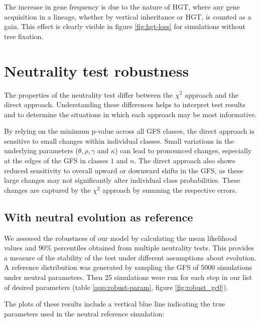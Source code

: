 The increase in gene frequency is due to the nature of \ac{HGT}, where any gene acquisition in a lineage, whether by vertical inheritance or \ac{HGT}, is counted as a gain.
This effect is clearly visible in figure \ref{fig:hgt-loss} for simulations without tree fixation.

\section{Neutrality test robustness}
The properties of the neutrality test differ between the $\chi^2$ approach and the direct approach.
Understanding these differences helps to interpret test results and to determine the situations in which each approach may be most informative.

By relying on the minimum p-value across all \ac{GFS} classes, the direct approach is sensitive to small changes within individual classes.
Small variations in the underlying parameters ($\theta, \rho, \gamma$ and $\kappa$) can lead to pronounced changes, especially at the edges of the \ac{GFS} in classes $1$ and $n$.
The direct approach also shows reduced sensitivity to overall upward or downward shifts in the GFS, as these large changes may not significantly alter individual class probabilities.
These changes are captured by the $\chi^2$ approach by summing the respective errors.

\subsection{With neutral evolution as reference}
We assessed the robustness of our model by calculating the mean likelihood values and 90\% percentiles obtained from multiple neutrality tests.
This provides a measure of the stability of the test under different assumptions about evolution.
A reference distribution was generated by sampling the \ac{GFS} of 5000 simulations under neutral parameters.
Then 25 simulations were run for each step in our list of desired parameters (table \ref{app:robust-param}, figure \ref{fig:robust_gc0}).

The plots of these results include a vertical blue line indicating the true parameters used in the neutral reference simulation:

